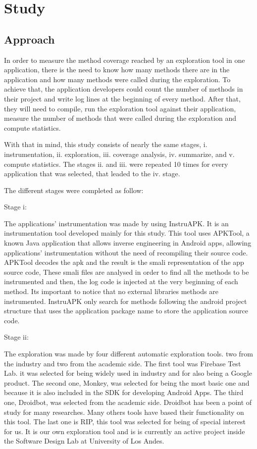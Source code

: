 \chapter{Study}
\label{chapter3}

\section{Approach}

In order to measure the method coverage reached by an exploration tool in one application, there is the need to know how many methods there are in the application and how many methods were called during the exploration. To achieve that, the application developers could count the number of methods in their project and write log lines at the beginning of every method. After that, they will need to compile, run the exploration tool against their application, measure the number of methods that were called during the exploration and compute statistics.

With that in mind, this study consists of nearly the same stages, i. instrumentation, ii. exploration, iii. coverage analysis, iv. summarize, and v. compute statistics. The stages ii. and iii. were repeated 10 times for every application that was selected, that leaded to the iv. stage.

The different stages were completed as follow:

Stage i: 

The applications' instrumentation was made by using InstruAPK. It is an instrumentation tool developed mainly for this study. This tool uses APKTool, a known Java application that allows inverse engineering in Android apps, allowing applications' instrumentation without the need of recompiling their source code. APKTool decodes the apk and the result is the smali representation of the app source code, These smali files are analysed in order to find all the methods to be instrumented and then, the log code is injected at the very beginning of each method. Its important to notice that no external libraries methods are instrumented. InstruAPK only search for methods following the android project structure that uses the application package name to store the application source code.

Stage ii: 

The exploration was made by four different automatic exploration tools. two from the industry and two from the academic side. The first tool was Firebase Test Lab. it was selected for being widely used in industry and for also being a Google product. The second one, Monkey, was selected for being the most basic one and because it is also included in the SDK for developing Android Apps. The third one, Droidbot, was selected from the academic side. Droidbot has been a point of study for many researches. Many others tools have based their functionality on this tool. The last one is RIP, this tool was selected for being of special interest for us. It is our own exploration tool and is is currently an active project inside the Software Design Lab at University of Los Andes. 


